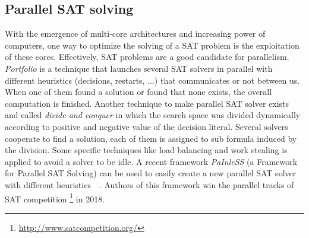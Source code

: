 \subsection{Parallel SAT solving}
With the emergence of multi-core architectures and increasing power of computers, one way to optimize the solving
of a SAT problem is the exploitation of these cores. Effectively, SAT problems are a good candidate for parallelism.
\emph{Portfolio} is a technique that launches several SAT solvers in parallel with different heuristics (decisions, restarts, ...) that 
communicates or not between us. When one of them found a solution or found that none exists, the overall computation is finished.
Another technique to make parallel SAT solver exists and called \emph{divide and conquer} in which the search space was divided 
dynamically according to positive and negative value of the decision literal. Several solvers cooperate to find a solution, 
each of them is assigned to sub formula induced by the division. Some specific techniques like load balancing and work stealing 
is applied to avoid a solver to be idle.
A recent framework \emph{PaInleSS} (a Framework for Parallel SAT Solving) can be used to easily create a new parallel 
SAT solver with different heuristics~\cite{le2017painless}~\cite{le2019modular}. Authors of this framework win the parallel 
tracks of SAT competition \footnote{\url{http://www.satcompetition.org/}} in 2018.



%
